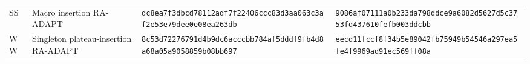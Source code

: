 \documentclass[10pt,letterpaper]{article}
\begin{document}
\begin{longtable}{@{}llp{2.55in}p{2.55in}@{}}
SS & Macro insertion RA-ADAPT & \texttt{dc8ea7f3}\allowbreak{}\texttt{dbcd7811}\allowbreak{}\texttt{2adf7f22}\allowbreak{}\texttt{406ccc83}\allowbreak{}\texttt{d3aa063c}\allowbreak{}\texttt{3af2e53e}\allowbreak{}\texttt{79dee0e0}\allowbreak{}\texttt{8ea263db}\allowbreak{} & \texttt{9086af07}\allowbreak{}\texttt{111a0b23}\allowbreak{}\texttt{3da798dd}\allowbreak{}\texttt{ce9a6082}\allowbreak{}\texttt{d5627d5c}\allowbreak{}\texttt{3753fd43}\allowbreak{}\texttt{7610fefb}\allowbreak{}\texttt{003ddcbb}\allowbreak{} \\
WW & Singleton plateau-insertion RA-ADAPT & \texttt{8c53d722}\allowbreak{}\texttt{76791d4b}\allowbreak{}\texttt{9dc6accc}\allowbreak{}\texttt{bb784af5}\allowbreak{}\texttt{dddf9fb4}\allowbreak{}\texttt{d8a68a05}\allowbreak{}\texttt{a9058859}\allowbreak{}\texttt{b08bb697}\allowbreak{} & \texttt{eecd11fc}\allowbreak{}\texttt{cf8f34b5}\allowbreak{}\texttt{e89042fb}\allowbreak{}\texttt{75949b54}\allowbreak{}\texttt{546a297e}\allowbreak{}\texttt{a5fe4f99}\allowbreak{}\texttt{69ad91ec}\allowbreak{}\texttt{569ff08a}\allowbreak{} \\
\bottomrule
\end{longtable}
\end{document}
